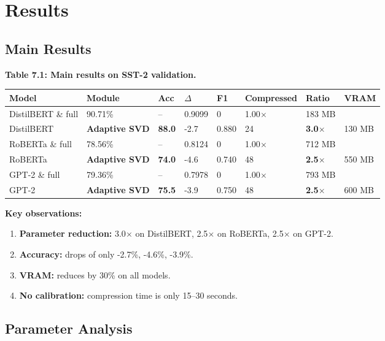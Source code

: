 
\section{Results}

\subsection{Main Results}

\textbf{Table 7.1: Main results on SST-2 validation.}

\begin{table}[H]
\centering
\small
\begin{tabular}{llllllll}
\toprule
\textbf{Model} & \textbf{Module} & \textbf{Acc} & \textbf{$\Delta$} & \textbf{F1} & \textbf{Compressed} & \textbf{Ratio} & \textbf{VRAM} \\
\midrule
DistilBERT \& full & 90.71\% & -- & 0.9099 & 0 & 1.00$\times$ & 183 MB \\
DistilBERT & \textbf{Adaptive SVD} & \textbf{88.0} & -2.7 & 0.880 & 24 & \textbf{3.0$\times$} & 130 MB \\
RoBERTa \& full & 78.56\% & -- & 0.8124 & 0 & 1.00$\times$ & 712 MB \\
RoBERTa & \textbf{Adaptive SVD} & \textbf{74.0} & -4.6 & 0.740 & 48 & \textbf{2.5$\times$} & 550 MB \\
GPT-2 \& full & 79.36\% & -- & 0.7978 & 0 & 1.00$\times$ & 793 MB \\
GPT-2 & \textbf{Adaptive SVD} & \textbf{75.5} & -3.9 & 0.750 & 48 & \textbf{2.5$\times$} & 600 MB \\
\bottomrule
\end{tabular}
\end{table}

\textbf{Key observations:}

\begin{enumerate}
\item \textbf{Parameter reduction:} 3.0$\times$ on DistilBERT, 2.5$\times$ on RoBERTa,
  2.5$\times$ on GPT-2.
\item \textbf{Accuracy:} drops of only -2.7\%, -4.6\%, -3.9\%.
\item \textbf{VRAM:} reduces by 30\% on all models.
\item \textbf{No calibration:} compression time is only 15--30 seconds.

\end{enumerate}
\subsection{Parameter Analysis}

